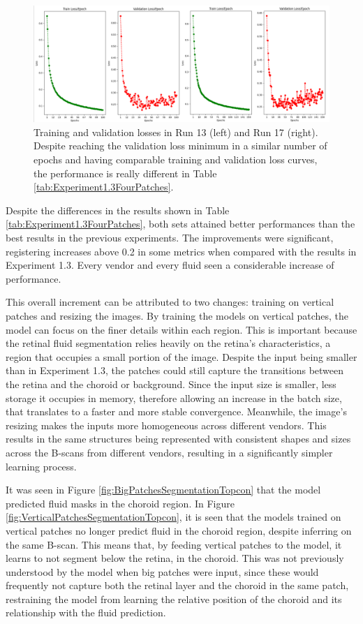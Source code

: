 \begin{figure}[!ht]
	\centering
	\includegraphics[width=1.0\linewidth]{figures/TrainingValidationLosses.png}
	\caption{Training and validation losses in Run 13 (left) and Run 17 (right). Despite reaching the validation loss minimum in a similar number of epochs and having comparable training and validation loss curves, the performance is really different in Table \ref{tab:Experiment1.3FourPatches}.}
	\label{fig:TrainingValidationLosses}
\end{figure}

Despite the differences in the results shown in Table \ref{tab:Experiment1.3FourPatches}, both sets attained better performances than the best results in the previous experiments. The improvements were significant, registering increases above 0.2 in some metrics when compared with the results in Experiment 1.3. Every vendor and every fluid seen a considerable increase of performance.
\par
This overall increment can be attributed to two changes: training on vertical patches and resizing the images. By training the models on vertical patches, the model can focus on the finer details within each region. This is important because the retinal fluid segmentation relies heavily on the retina's characteristics, a region that occupies a small portion of the image. Despite the input being smaller than in Experiment 1.3, the patches could still capture the transitions between the retina and the choroid or background. Since the input size is smaller, less storage it occupies in memory, therefore allowing an increase in the batch size, that translates to a faster and more stable convergence. Meanwhile, the image's resizing makes the inputs more homogeneous across different vendors. This results in the same structures being represented with consistent shapes and sizes across the B-scans from different vendors, resulting in a significantly simpler learning process.
\par
It was seen in Figure \ref{fig:BigPatchesSegmentationTopcon} that the model predicted fluid masks in the choroid region. In Figure \ref{fig:VerticalPatchesSegmentationTopcon}, it is seen that the models trained on vertical patches no longer predict fluid in the choroid region, despite inferring on the same B-scan. This means that, by feeding vertical patches to the model, it learns to not segment below the retina, in the choroid. This was not previously understood by the model when big patches were input, since these would frequently not capture both the retinal layer and the choroid in the same patch, restraining the model from learning the relative position of the choroid and its relationship with the fluid prediction.

